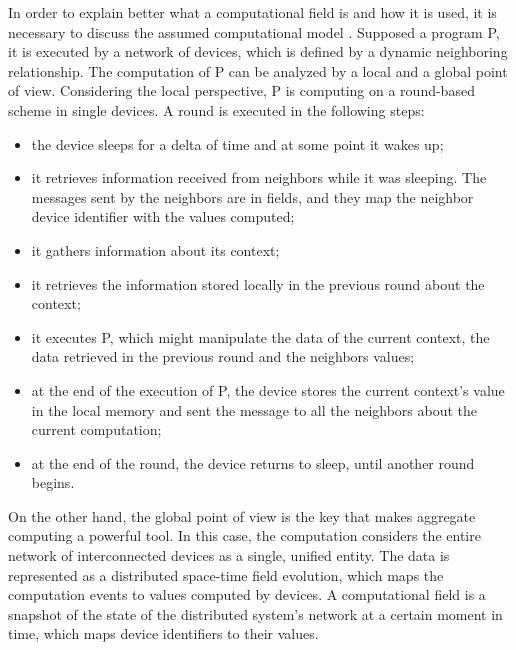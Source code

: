 In order to explain better what a computational field is and how it is used, it is necessary to discuss the assumed computational model \cite{computational_fields_theory}.
Supposed a program P, it is executed by a network of devices, which is defined by a dynamic neighboring relationship. The computation of P can be analyzed by a local and a global point of view.
Considering the local perspective, P is computing on a round-based scheme in single devices. A round is executed in the following steps:
\begin{itemize}
    \item the device sleeps for a delta of time and at some point it wakes up;
    \item it retrieves information received from neighbors while it was sleeping. The messages sent by the neighbors are in fields, and they map the neighbor device identifier with the values computed;
    \item it gathers information about its context;
    \item it retrieves the information stored locally in the previous round about the context;
    \item it executes P, which might manipulate the data of the current context, the data retrieved in the previous round and the neighbors values;
    \item at the end of the execution of P, the device stores the current context's value in the local memory and sent the message to all the neighbors about the current computation;
    \item at the end of the round, the device returns to sleep, until another round begins.
\end{itemize}

On the other hand, the global point of view is the key that makes aggregate computing a powerful tool. In this case, the computation considers the entire network of interconnected devices as a single, unified entity.\newline
The data is represented as a distributed space-time field evolution, which maps the computation events to values computed by devices.\newline
A computational field is a snapshot of the state of the distributed system's network at a certain moment in time, which maps device identifiers to their values.

